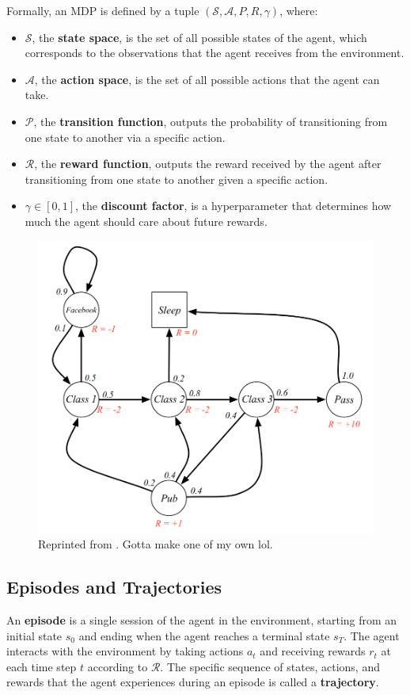 \documentclass[12pt]{report}
\theoremstyle{definition}
\theoremstyle{remark}
\begin{document}
Formally, an MDP is defined by a tuple $(\mathcal{S}, \mathcal{A}, P, R, \gamma)$, where:
\begin{itemize}
    \item $\mathcal{S}$, the \textbf{state space}, is the set of all possible states of the agent, which corresponds to the observations that the agent receives from the environment.
    \item $\mathcal{A}$, the \textbf{action space}, is the set of all possible actions that the agent can take.
    \item $\mathcal{P}$, the \textbf{transition function}, outputs the probability of transitioning from one state to another via a specific action.
    \item $\mathcal{R}$, the \textbf{reward function}, outputs the reward received by the agent after transitioning from one state to another given a specific action.
    \item $\gamma \in [0,1]$, the \textbf{discount factor}, is a hyperparameter that determines how much the agent should care about future rewards.
\end{itemize}



\begin{figure}[h]
    \centering
    \includegraphics[width=0.7\linewidth]{figs/mdp.png}
    \caption{Reprinted from \cite{silver_lecture_nodate}. Gotta make one of my own lol.}
    \label{fig:enter-label}
\end{figure}

\subsection{Episodes and Trajectories}
An \textbf{episode} is a single session of the agent in the environment, starting from an initial state $s_0$ and ending when the agent reaches a terminal state $s_T$. The agent interacts with the environment by taking actions $a_t$ and receiving rewards $r_t$ at each time step $t$ according to $\mathcal{R}$. The specific sequence of states, actions, and rewards that the agent experiences during an episode is called a \textbf{trajectory}.
\end{document}
